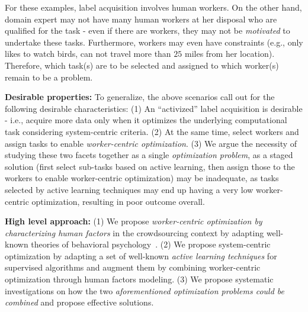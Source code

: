 \begin{example}

For these examples, label acquisition involves human workers. On the other hand, domain expert may not have many human workers at her disposal who are qualified for the task - even if there are workers, they may not be {\em motivated} to undertake these tasks. Furthermore, workers may even have constraints (e.g., only likes to watch birds, can not travel more than $25$ miles from her location). Therefore, which task(s) are to be selected and assigned to which worker(s) remain to be a problem.
\end{example}
 

{\bf Desirable properties:} To generalize, the above scenarios call out for the following desirable characteristics: (1) An ``activized'' label acquisition is desirable - i.e., acquire more data only when it optimizes the underlying computational task considering system-centric criteria. (2) At the same time, select workers and assign tasks to enable {\em worker-centric optimization}. (3) We argue the necessity of studying these two facets together as a single {\em optimization problem}, as a staged solution (first select sub-tasks based on active learning, then assign those to the workers to enable worker-centric optimization) may be inadequate, as tasks selected by active learning techniques may end up having a very low worker-centric optimization, resulting in poor outcome overall.

{\bf High level approach:} (1) We propose {\em worker-centric optimization by characterizing human factors} in the crowdsourcing context by adapting well-known theories of behavioral psychology~\cite{hf1,motiv1,motiv2}. (2) We propose system-centric optimization  by adapting a set of well-known {\em active learning techniques} for supervised algorithms \cite{al1,al2,al-survey,qbc1,al-clus1,al-clus2,al-clus3,al-clus4,multi0,multi1,multi2,multi3} and augment them by combining worker-centric optimization through human factors modeling. (3) We propose systematic investigations on how the two {\em aforementioned optimization problems could be combined} and propose effective solutions. 


